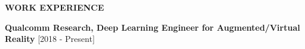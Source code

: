 \documentclass{article}
\def\vsp{4pt}
\begin{document}

\begin{theorem}
   \vspace{-1.2mm}
\begin{center}
\textbf{ WORK EXPERIENCE
}\end{center}  
\vspace{-0.7mm}    
   \end{theorem}
\vspace{-1mm}
\hspace{2.7mm} \textbf{Qualcomm Research, Deep Learning Engineer for Augmented/Virtual Reality} \hfill{[2018 - Present]}
\end{document}
